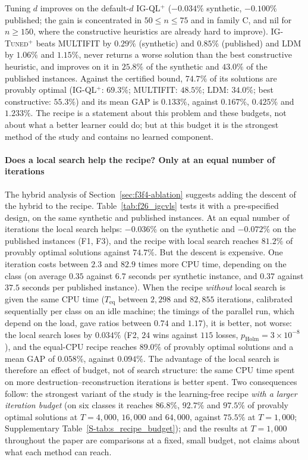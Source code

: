 \documentclass[final,3p,times,11pt,authoryear]{elsarticle}
\begin{document}


Tuning $d$ improves on the default-$d$ IG-QL$^{+}$ ($-0.034\%$ synthetic,
$-0.100\%$ published; the gain is concentrated in $50 \leq n \leq 75$ and in
family C, and nil for $n \geq 150$, where the constructive heuristics are
already hard to improve). \textsc{IG-Tuned}$^{+}$ beats MULTIFIT by $0.29\%$
(synthetic) and $0.85\%$ (published) and LDM by $1.06\%$ and $1.15\%$, never
returns a worse solution than the best constructive heuristic, and improves on
it in $25.8\%$ of the synthetic and $43.0\%$ of the published instances. Against
the certified bound, $74.7\%$ of its solutions are provably optimal (IG-QL$^{+}$:
$69.3\%$; MULTIFIT: $48.5\%$; LDM: $34.0\%$; best constructive: $55.3\%$) and its mean GAP is
$0.133\%$, against $0.167\%$, $0.425\%$ and $1.233\%$. The recipe is a
statement about this problem and these budgets, not about what a better
learner could do; but at this budget it is the strongest method of the study and
contains no learned component.

\paragraph{Does a local search help the recipe? Only at an equal number of iterations}
The hybrid analysis of Section~\ref{sec:f3f4-ablation} suggests adding the descent of
the hybrid to the recipe. Table~\ref{tab:f26_igcvls} tests it with a pre-specified
design, on the same synthetic and published instances. At an equal number of
iterations the local search helps: $-0.036\%$ on the synthetic and $-0.072\%$ on
the published instances (F1, F3), and the recipe with local search reaches $81.2\%$
of provably optimal solutions against $74.7\%$. But the descent is expensive. One
iteration costs between $2.3$ and $82.9$ times more CPU time, depending on the
class (on average $0.35$ against $6.7$ seconds per synthetic instance, and $0.37$
against $37.5$ seconds per published instance). When the recipe \emph{without}
local search is given the same CPU time ($T_{\mathrm{eq}}$ between $2{,}298$ and
$82{,}855$ iterations, calibrated sequentially per class on an idle machine; the timings
of the parallel run, which depend on the load, gave ratios between $0.74$ and $1.17$),
it is better, not worse: the local search loses by $0.034\%$ (F2, $24$ wins against
$115$ losses, $p_{\mathrm{Holm}}=3\times10^{-8}$), and the equal-CPU recipe reaches
$89.0\%$ of provably optimal solutions and a mean GAP of $0.058\%$, against $0.094\%$.
The advantage of the local search is therefore an effect of budget, not of search
structure: the same CPU time spent on more destruction--reconstruction iterations is
better spent. Two consequences follow: the strongest variant of the study is the
learning-free recipe \emph{with a larger iteration budget} (on six classes it reaches $86.8\%$, $92.7\%$ and $97.5\%$ of provably optimal solutions at $T=4{,}000$, $16{,}000$ and $64{,}000$, against $75.5\%$ at $T=1{,}000$; Supplementary Table~\ref{S-tab:s_recipe_budget}); and the results at
$T=1{,}000$ throughout the paper are comparisons at a fixed, small budget, not claims
about what each method can reach.
\end{document}
